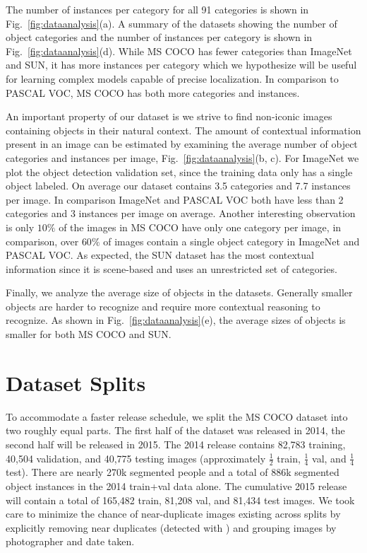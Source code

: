 The number of instances per category for all 91 categories is shown in Fig.~\ref{fig:dataanalysis}(a). A summary of the datasets showing the number of object categories and the number of instances per category is shown in Fig.~\ref{fig:dataanalysis}(d). While MS COCO has fewer categories than ImageNet and SUN, it has more instances per category which we hypothesize will be useful for learning complex models capable of precise localization.  In comparison to PASCAL VOC, MS COCO has both more categories and instances.

An important property of our dataset is we strive to find non-iconic images containing objects in their natural context. The amount of contextual information present in an image can be estimated by examining the average number of object categories and instances per image, Fig.~\ref{fig:dataanalysis}(b, c). For ImageNet we plot the object detection validation set, since the training data only has a single object labeled. On average our dataset contains 3.5 categories and 7.7 instances per image. In comparison ImageNet and PASCAL VOC both have less than 2 categories and 3 instances per image on average. Another interesting observation is only $10\%$ of the images in MS COCO have only one category per image, in comparison, over $60\%$ of images contain a single object category in ImageNet and PASCAL VOC.  As expected, the SUN dataset has the most contextual information since it is scene-based and uses an unrestricted set of categories.

Finally, we analyze the average size of objects in the datasets. Generally smaller objects are harder to recognize and require more contextual reasoning to recognize. As shown in Fig.~\ref{fig:dataanalysis}(e), the average sizes of objects is smaller for both MS COCO and SUN.

\section{Dataset Splits}

To accommodate a faster release schedule, we split the MS COCO dataset into two roughly equal parts. The first half of the dataset was released in 2014, the second half will be released in 2015. The 2014 release contains 82,783 training, 40,504 validation, and 40,775 testing images (approximately $\frac{1}{2}$ train, $\frac{1}{4}$ val, and $\frac{1}{4}$ test). There are nearly 270k segmented people and a total of 886k segmented object instances in the 2014 train+val data alone. The cumulative 2015 release will contain a total of 165,482 train, 81,208 val, and 81,434 test images. We took care to minimize the chance of near-duplicate images existing across splits by explicitly removing near duplicates (detected with \cite{douze2009evaluation}) and grouping images by photographer and date taken.

